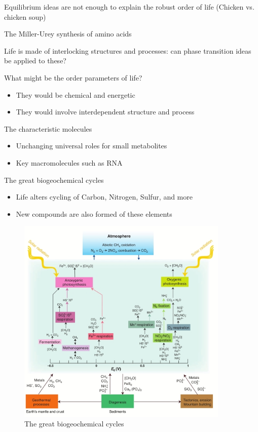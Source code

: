 \documentclass[]{article}
\begin{document}
Equilibrium ideas are not enough to explain the robust order of life (Chicken vs. chicken soup)


The Miller-Urey synthesis of amino acids\cite{miller1959organic}

Life is made of interlocking structures and processes: can phase transition ideas
be applied to these?

What might be the order parameters of life?

\begin{itemize}
	\item They would be chemical and energetic
	\item They would involve interdependent	structure and process
\end{itemize}

The characteristic molecules
\begin{itemize}
	\item Unchanging universal roles 	for small metabolites
	\item Key macromolecules such as RNA
\end{itemize}

The great biogeochemical cycles
\begin{itemize}
	\item Life alters cycling of Carbon, Nitrogen, Sulfur, and more
	\item New compounds are also formed of 	these elements
\end{itemize}

\begin{figure}[H]
	\caption[The great biogeochemical cycles]{The great biogeochemical cycles\cite{falkowski2008microbial}}\label{fig:biogeochemical} 
	\includegraphics[width=0.9\textwidth]{biogeochemical}
\end{figure}
\end{document}

